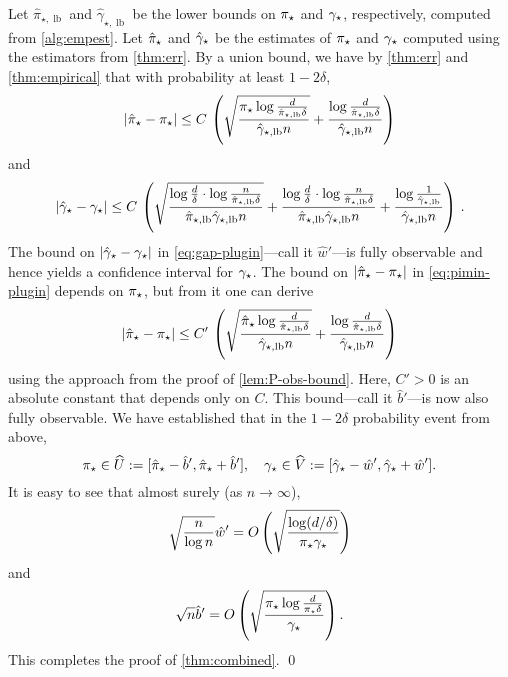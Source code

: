 \newcommand\LB{\ensuremath{\operatorname{lb}}}
\newcommand\piminlb{\ensuremath{\hat\pi_{\star,\LB}}}
\newcommand\gaplb{\ensuremath{\hat\gamma_{\star,\LB}}}
Let $\piminlb$ and $\gaplb$ be the lower bounds on $\pi_{\star}$ and
$\gamma_{\star}$, respectively, computed from \cref{alg:empest}.
Let $\hat\pi_{\star}$ and $\hat\gamma_{\star}$ be the estimates of $\pi_{\star}$ and $\gamma_{\star}$
computed using the estimators from \cref{thm:err}.
By a union bound, we have by \cref{thm:err} and \cref{thm:empirical}
that with probability at least $1-2\delta$,
\begin{equation}
  \Abs{\hatpimin-\pimin}
  \le
  C \,
  \Parens{
    \sqrt{\frac{\pimin\log\frac{d}{\piminlb\delta}}{\gaplb n}}
    +
    \frac{\log\frac{d}{\piminlb\delta}}{\gaplb n}
  }
  \label{eq:pimin-plugin}
\end{equation}
and
\begin{equation}
  \Abs{\hatgap-\gap}
  \leq
  C \,
  \Parens{
    \sqrt{\frac{\log\frac{d}{\delta}\cdot\log\frac{n}{\piminlb\delta}}{\piminlb\gaplb n}}
    +
    \frac{\log\frac{d}{\delta}\cdot\log\frac{n}{\piminlb\delta}}{\piminlb\gaplb n}  
    + \frac{\log\frac{1}{\gaplb}}{\gaplb n}  
  }
  \,.
  \label{eq:gap-plugin}
\end{equation}
The bound on $|\hat\gamma_{\star}-\gamma_{\star}|$ in \cref{eq:gap-plugin}---call it
$\hat{w}'$---is fully observable and hence yields a confidence
interval for $\gamma_{\star}$.
The bound on $|\hat\pi_{\star}-\pi_{\star}|$ in \cref{eq:pimin-plugin}
depends on $\pi_{\star}$, but from it one can derive
\[
  \Abs{\hatpimin-\pimin}
  \le
  C' \,
  \Parens{
    \sqrt{\frac{\hatpimin\log\frac{d}{\piminlb\delta}}{\gaplb n}}
    +
    \frac{\log\frac{d}{\piminlb\delta}}{\gaplb n}
  }
\]
using the approach from the proof of \cref{lem:P-obs-bound}.
Here, $C'>0$ is an absolute constant that depends only on $C$.
This bound---call it $\hat{b}'$---is now also fully observable.
We have established that in the $1-2\delta$ probability event from
above,
\[
  \pi_{\star} \in \widehat{U} := [\hat\pi_{\star}-\hat{b}', \hat\pi_{\star}+\hat{b}']
  , \quad
  \gamma_{\star} \in \widehat{V} := [\hat\gamma_{\star}-\hat{w}', \hat\gamma_{\star}+\hat{w}']
  .
\]
It is easy to see that almost surely (as $n \to \infty$),
\[
  \sqrt{\frac{n}{\log n}} \hat{w}'
  = O\left(
    \sqrt{\frac{\log(d/\delta)}{\pi_{\star}\gamma_{\star}}}
  \right)
\]
and
\[
  \sqrt{n} \hat{b}'
  = O\left(
    \sqrt{\frac{\pi_{\star} \log\frac{d}{\pi_{\star}\delta}}{\gamma_{\star}}}
  \right)
  .
\]
This completes the proof of \cref{thm:combined}.
\hfill\qed

